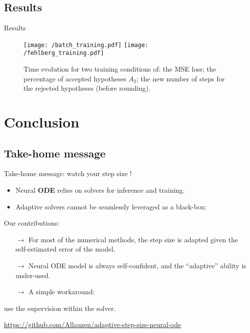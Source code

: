 \documentclass{EESD}
\begin{document}
\subsection{Results}
\begin{frame}{Results}
    \begin{figure}
        \centering
        \texttt{[image: /batch\_training.pdf]}
        \texttt{[image: /fehlberg\_training.pdf]}
        \caption{Time evolution for two training conditions of: the MSE loss; the percentage of accepted hypotheses $A_2$; the new number of steps for the rejected hypotheses (before rounding).}
        \label{fig:lorenz_error}
    \end{figure}                                                    
\end{frame}


\section{Conclusion}

\subsection{Take-home message}
\begin{frame}{Take-home message: watch your step size !}
  \begin{itemize}
  \item Neural \textbf{ODE} relies on
    solvers for inference and training. 
  \item  Adaptive solvers cannot be seamlessly
    leveraged as a black-box: %
  \end{itemize}
  \begin{alertblock}{Our contributions:}
    \begin{itemize}
    \item[$\rightarrow$] For most of the numerical methods, the step size is adapted given the self-estimated error of the model.
    \item[$\rightarrow$] Neural ODE model is always self-confident, and the ``adaptive'' ability is under-used. 
    \item[$\rightarrow$] A simple workaround:
    \end{itemize}
  \begin{center}
    use the supervision within the solver.
  \end{center}
      \hfill\url{https://github.com/Allauzen/adaptive-step-size-neural-ode}
  \end{alertblock}
\end{frame}
\end{document}
